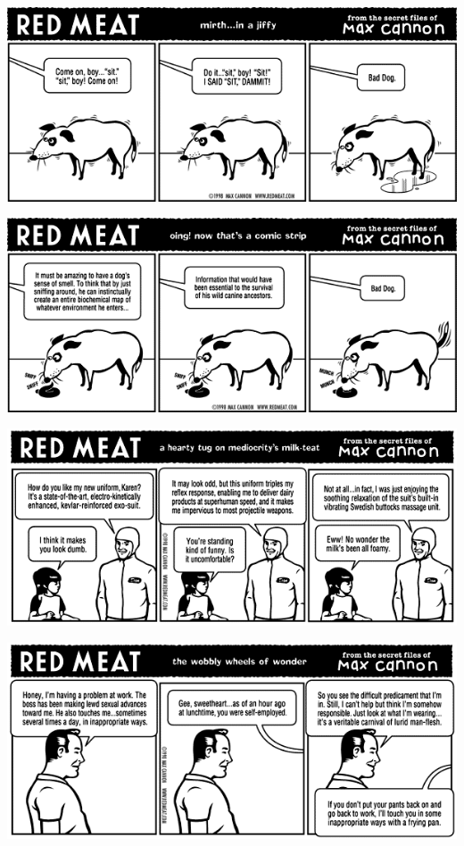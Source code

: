 \documentclass[a4paper,twoside,11pt]{article}
\begin{document}
\includegraphics[width=\textwidth]{redmeat_1998-07-06.png}



\includegraphics[width=\textwidth]{redmeat_1998-07-13.png}



\includegraphics[width=\textwidth]{redmeat_1998-07-20.png}



\includegraphics[width=\textwidth]{redmeat_1998-07-27.png}
\end{document}
